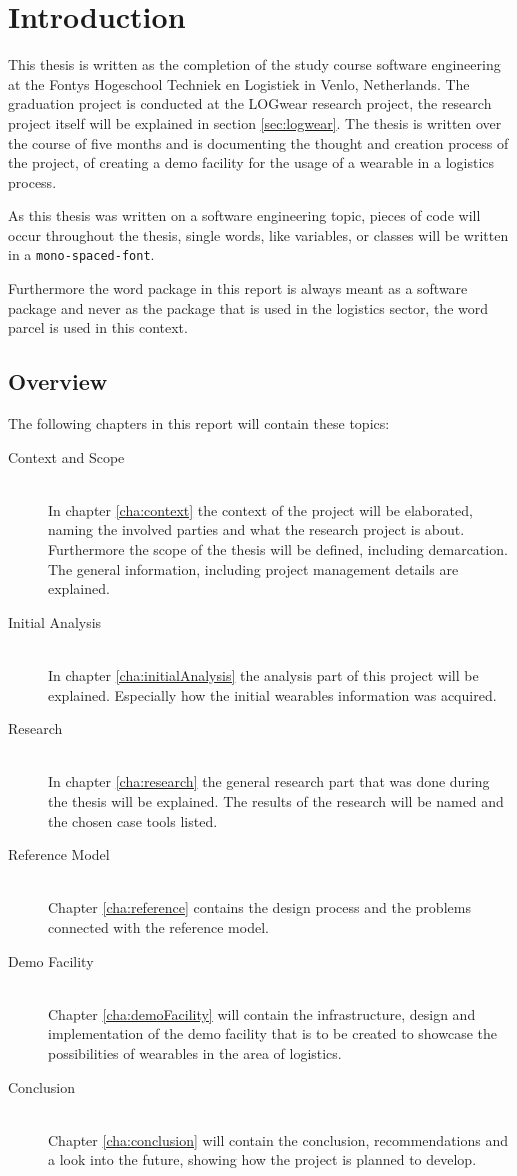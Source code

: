 \chapter{Introduction}
This thesis is written as the completion of the study course software engineering at the Fontys Hogeschool Techniek en Logistiek in Venlo, Netherlands. The graduation project is conducted at the LOGwear research project, the research project itself will be explained in section \ref{sec:logwear}. The thesis is written over the course of five months and is documenting the thought and creation process of the project, of creating a demo facility for the usage of a wearable in a logistics process.

As this thesis was written on a software engineering topic, pieces of code will occur throughout the thesis, single words, like variables, or classes will be written in a \texttt{mono-spaced-font}. 

Furthermore the word \gls{package} in this report is always meant as a software package and never as the package that is used in the logistics sector, the word \gls{parcel} is used in this context.
\section*{Overview}
The following chapters in this report will contain these topics:

\begin{description}
	\item[Context and Scope] \hfill \\
	In chapter \ref{cha:context} the context of the project will be elaborated, naming the involved parties and what the research project is about. Furthermore the scope of the thesis will be defined, including demarcation. The general information, including project management details are explained.
	\item[Initial Analysis] \hfill \\
	In chapter \ref{cha:initialAnalysis} the analysis part of this project will be explained. Especially how the initial wearables information was acquired.
	\item[Research] \hfill \\
	In chapter \ref{cha:research} the general research part that was done during the thesis will be explained. The results of the research will be named and the chosen \gls{case} tools listed.
	\item[Reference Model] \hfill \\
	Chapter \ref{cha:reference} contains the design process and the problems connected with the reference model.
	\item[Demo Facility] \hfill \\
	Chapter \ref{cha:demoFacility} will contain the infrastructure, design and implementation of the demo facility that is to be created to showcase the possibilities of wearables in the area of logistics.
	\item[Conclusion] \hfill \\
	Chapter \ref{cha:conclusion} will contain the conclusion, recommendations and a look into the future, showing how the project is planned to develop.
\end{description}